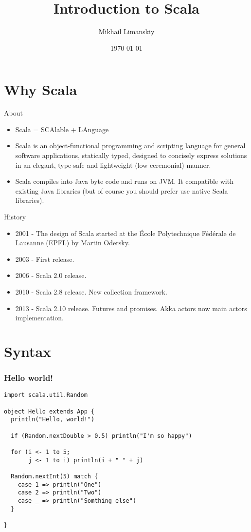 \documentclass{beamer}
\title{Introduction to Scala}
\author{Mikhail Limanskiy}
\institute{SymphonyTeleca}
\date{\today}
\begin{document}
\begin{frame}
    \titlepage
\end{frame}

\section{Why Scala}

\begin{frame}{About}

\begin{itemize}
  \item Scala = SCAlable + LAnguage

  \item Scala is an object-functional programming and scripting language for general software applications, statically typed, designed to concisely express solutions in an elegant, type-safe and lightweight (low ceremonial) manner.

  \item Scala compiles into Java byte code and runs on JVM. It compatible with existing Java libraries (but of course you should prefer use native Scala libraries).
\end{itemize}

\end{frame}

\begin{frame}{History}

\begin{itemize}
  \item 2001 - The design of Scala started at the École Polytechnique Fédérale de Lausanne (EPFL) by Martin Odersky.
  \item 2003 - First release.
  \item 2006 - Scala 2.0 release.
  \item 2010 - Scala 2.8 release. New collection framework.
  \item 2013 - Scala 2.10 release. Futures and promises. Akka actors now main actors implementation.
\end{itemize}
\end{frame}

\section{Syntax}

\begin{frame}[fragile]
\frametitle{Hello world!}

\begin{lstlisting}
import scala.util.Random

object Hello extends App {
  println("Hello, world!")

  if (Random.nextDouble > 0.5) println("I'm so happy")

  for (i <- 1 to 5;
       j <- 1 to i) println(i + " " + j)

  Random.nextInt(5) match {
    case 1 => println("One")
    case 2 => println("Two")
    case _ => println("Somthing else")
  }

}
\end{lstlisting}

\end{frame}
\end{document}
